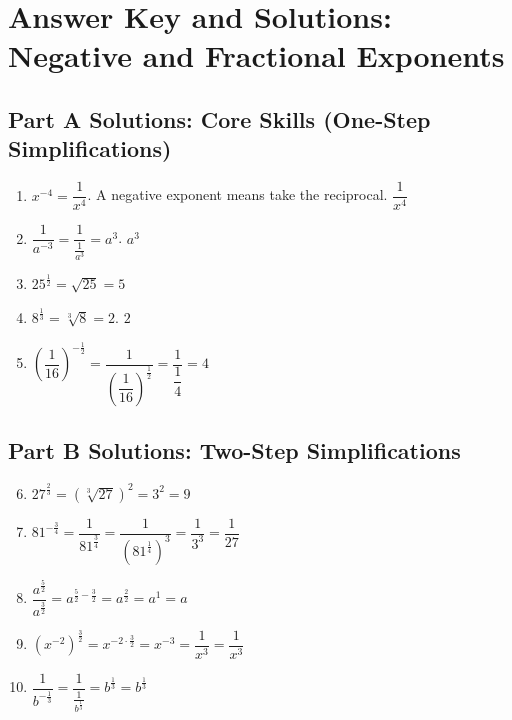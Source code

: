 \documentclass[14pt]{extarticle}
\begin{document}
\newpage


\section*{Answer Key and Solutions: Negative and Fractional Exponents}

\subsection*{Part A Solutions: Core Skills (One-Step Simplifications)}
\begin{enumerate}
  \item \(x^{-4} = \dfrac{1}{x^4}\). A negative exponent means take the reciprocal. \(\boxed{\dfrac{1}{x^4}}\)

  \item \(\dfrac{1}{a^{-3}} = \dfrac{1}{\frac{1}{a^3}} = a^3\). \(\boxed{a^3}\)

  \item \(25^{\frac{1}{2}} = \sqrt{25} = \boxed{5}\)

  \item \(8^{\frac{1}{3}} = \sqrt[3]{8} = 2\). \(\boxed{2}\)

  \item \(\left(\dfrac{1}{16}\right)^{-\frac{1}{2}} = \dfrac{1}{\left(\dfrac{1}{16}\right)^{\frac{1}{2}}}
  = \dfrac{1}{\dfrac{1}{4}} = \boxed{4}\)
\end{enumerate}

\subsection*{Part B Solutions: Two-Step Simplifications}
\begin{enumerate}
  \setcounter{enumi}{5}
  \item \(27^{\frac{2}{3}} = \left(\sqrt[3]{27}\right)^2 = 3^2 = \boxed{9}\)

  \item \(81^{-\frac{3}{4}} = \dfrac{1}{81^{\frac{3}{4}}}
  = \dfrac{1}{\left(81^{\frac{1}{4}}\right)^3}
  = \dfrac{1}{3^3}
  = \boxed{\dfrac{1}{27}}\)

  \item \(\dfrac{a^{\frac{5}{2}}}{a^{\frac{3}{2}}}
  = a^{\frac{5}{2} - \frac{3}{2}}
  = a^{\frac{2}{2}}
  = a^1
  = \boxed{a}\)

  \item \((x^{-2})^{\frac{3}{2}}
  = x^{-2 \cdot \frac{3}{2}}
  = x^{-3}
  = \dfrac{1}{x^3}
  = \boxed{\dfrac{1}{x^3}}\)

  \item \(\dfrac{1}{b^{-\frac{1}{3}}}
  = \dfrac{1}{\frac{1}{b^{\frac{1}{3}}}}
  = b^{\frac{1}{3}}
  = \boxed{b^{\frac{1}{3}}}\)
\end{enumerate}
\end{document}
